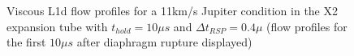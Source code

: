 \documentclass[a4paper,10pt]{article}
\begin{document}
\begin{figure}[htbp]
\begin{center}
{{      } \quad
      }
    \caption{Viscous L1d flow profiles for a 11km/s Jupiter condition in the X2 expansion tube with $t_{hold} = 10 \mu s$ and $\Delta t_{RSP} = 0.4 \mu $ (flow profiles for the first $10 \mu s$ after diaphragm rupture displayed)}
    \label{fig:jupiter_profiles}
  \end{center}
\end{figure}
\end{document}
